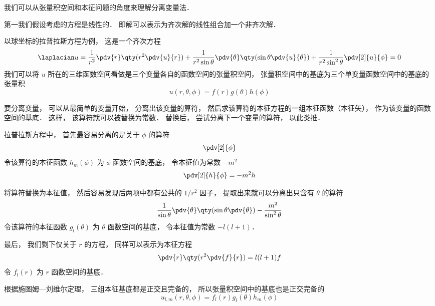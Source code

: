 

我们可以从张量积空间和本征问题的角度来理解分离变量法．

第一我们假设考虑的方程是线性的． 即解可以表示为齐次解的线性组合加一个非齐次解．

以球坐标的拉普拉斯方程为例， 这是一个齐次方程
\begin{equation}
\laplacian u = \frac{1}{r^2} \pdv{r} \qty(r^2 \pdv{u}{r}) + \frac{1}{r^2 \sin\theta}\pdv{\theta} \qty(\sin \theta \pdv{u}{\theta}) + \frac{1}{r^2 \sin^2 \theta} \pdv[2]{u}{\phi} = 0
\end{equation}
我们可以将 $u$ 所在的三维函数空间看做是三个变量各自的函数空间的张量积空间， 张量积空间中的基底为三个单变量函数空间中的基底的张量积
\begin{equation}
u(r, \theta, \phi) = f(r) g(\theta) h(\phi)
\end{equation}

要分离变量， 可以从最简单的变量开始， 分离出该变量的算符， 然后求该算符的本征方程的一组本征函数（本征矢）， 作为该变量的函数空间的基底． 这样， 该算符就可以被替换为常数． 替换后， 尝试分离下一个变量的算符， 以此类推．

拉普拉斯方程中， 首先最容易分离的是关于 $\phi$ 的算符
\begin{equation}
\pdv[2]{\phi}
\end{equation}
令该算符的本征函数 $h_m(\phi)$ 为 $\phi$ 函数空间的基底， 令本征值为常数 $-m^2$
\begin{equation}
\pdv[2]{h}{\phi} = -m^2 h
\end{equation}
 
将算符替换为本征值， 然后容易发现后两项中都有公共的 $1/r^2$ 因子， 提取出来就可以分离出只含有 $\theta$ 的算符
\begin{equation}
 \frac{1}{\sin\theta}\pdv{\theta} \qty(\sin \theta \pdv{\theta}) - \frac{m^2}{\sin^2 \theta}
\end{equation}
令该算符的本征函数 $g_l(\theta)$ 为 $\theta$ 函数空间的基底， 令本征值为常数 $-l(l+1)$．

最后， 我们剩下仅关于 $r$ 的方程， 同样可以表示为本征方程
\begin{equation}
\pdv{r} \qty(r^2 \pdv{f}{r}) = l(l+1) f
\end{equation}
令 $f_l(r)$ 为 $r$ 函数空间的基底．

根据施图姆—刘维尔定理， 三组本征基底都是正交且完备的， 所以张量积空间中的基底也是正交完备的
\begin{equation}
u_{l,m}(r, \theta, \phi) = f_l(r) g_l(\theta) h_m(\phi)
\end{equation}

